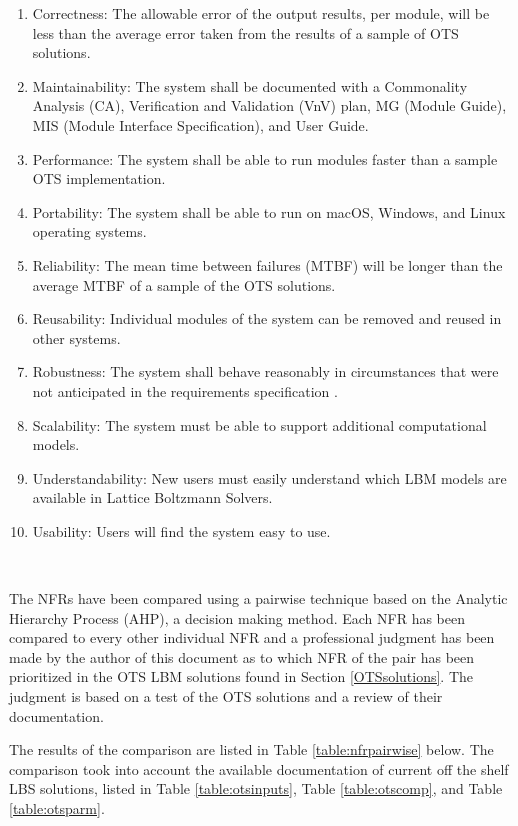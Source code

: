 \documentclass[12pt]{article}
\newcommand{\famname}{Lattice Boltzmann Solvers} %
\begin{document}
\begin{enumerate}
\item Correctness: The allowable error of the output results, per module, will be less than the average error taken from the results of a sample of OTS solutions.
\item Maintainability: The system shall be documented with a Commonality Analysis (CA), Verification and Validation (VnV) plan, MG (Module Guide), MIS (Module Interface Specification), and User Guide.
\item Performance: The system shall be able to run modules faster than a sample OTS implementation.
\item Portability: The system shall be able to run on macOS, Windows, and Linux operating systems.
\item Reliability: The mean time between failures (MTBF) will be longer than the average MTBF of a sample of the OTS solutions.
\item Reusability: Individual modules of the system can be removed and reused in other systems.
\item Robustness: The system shall behave reasonably in circumstances that were not anticipated in the requirements specification \cite{ghezzi1991fundamentals}.
\item Scalability: The system must be able to support additional computational models.
\item Understandability: New users must easily understand which LBM models are available in {\famname}.
\item Usability: Users will find the system easy to use.
\end{enumerate}

~\newpage

The NFRs have been compared using a pairwise technique based on the Analytic Hierarchy Process (AHP), a decision making method. Each NFR has been compared to every other individual NFR and a professional judgment has been made by the author of this document as to which NFR of the pair has been prioritized in the OTS LBM solutions found in Section \ref{OTSsolutions}. The judgment is based on a test of the OTS solutions and a review of their documentation.

The results of the comparison are listed in Table \ref{table:nfrpairwise} below. The comparison took into account the available documentation of current off the shelf LBS solutions, listed in Table \ref{table:otsinputs}, Table \ref{table:otscomp}, and Table \ref{table:otsparm}.
\\
\end{document}
